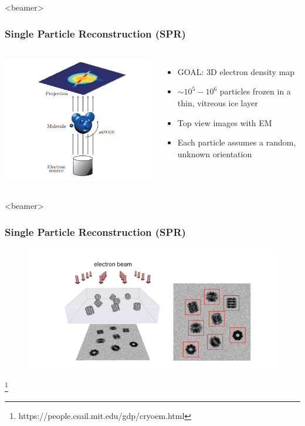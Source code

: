\documentclass{beamer}
\newcommand\blfootnote[1]{%
  \begingroup
  \renewcommand\thefootnote{}\footnote{#1}%
  \addtocounter{footnote}{-1}%
  \endgroup
}
\begin{document}
\begin{frame}<beamer>
\frametitle{Single Particle Reconstruction (SPR)}
\begin{columns}
\centering
\includegraphics[scale=0.7]{figures/cryoem_imaging.png}
\begin{itemize}
\item GOAL: 3D electron density map 
\item $\sim 10^5-10^6$ particles frozen in a thin, vitreous ice layer
\item Top view images with EM
\item Each particle assumes a random, unknown orientation
\end{itemize}
\end{columns}
\end{frame}

\begin{frame}<beamer>
\frametitle{Single Particle Reconstruction (SPR)}
\begin{figure}[h]
\centering
{\includegraphics[scale=0.65]{figures/imaging_model.png}}
\label{fig:rawims}
\end{figure} 
\blfootnote{https://people.csail.mit.edu/gdp/cryoem.html}
\end{frame}
\end{document}
